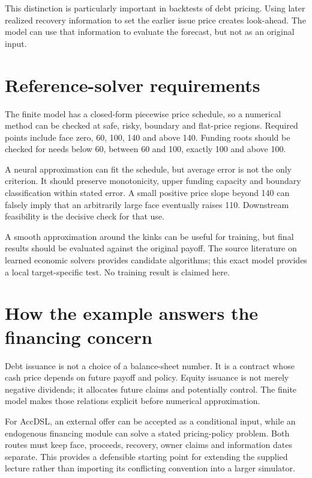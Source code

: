 This distinction is particularly important in backtests of debt pricing. Using later realized recovery information to set the earlier issue price creates look-ahead. The model can use that information to evaluate the forecast, but not as an original input.



\section{Reference-solver requirements}
The finite model has a closed-form piecewise price schedule, so a numerical method can be checked at safe, risky, boundary and flat-price regions. Required points include face zero, 60, 100, 140 and above 140. Funding roots should be checked for needs below 60, between 60 and 100, exactly 100 and above 100.

A neural approximation can fit the schedule, but average error is not the only criterion. It should preserve monotonicity, upper funding capacity and boundary classification within stated error. A small positive price slope beyond 140 can falsely imply that an arbitrarily large face eventually raises 110. Downstream feasibility is the decisive check for that use.

A smooth approximation around the kinks can be useful for training, but final results should be evaluated against the original payoff. The source literature on learned economic solvers provides candidate algorithms; this exact model provides a local target-specific test. No training result is claimed here.

\section{How the example answers the financing concern}
Debt issuance is not a choice of a balance-sheet number. It is a contract whose cash price depends on future payoff and policy. Equity issuance is not merely negative dividends; it allocates future claims and potentially control. The finite model makes those relations explicit before numerical approximation.

For AccDSL, an external offer can be accepted as a conditional input, while an endogenous financing module can solve a stated pricing-policy problem. Both routes must keep face, proceeds, recovery, owner claims and information dates separate. This provides a defensible starting point for extending the supplied lecture rather than importing its conflicting convention into a larger simulator.










